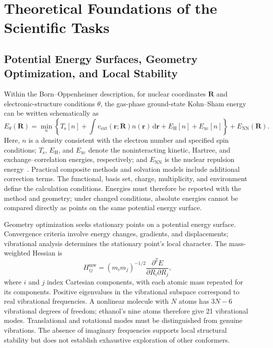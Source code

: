 \section{Theoretical Foundations of the Scientific Tasks}
\subsection{Potential Energy Surfaces, Geometry Optimization, and Local Stability}
Within the Born--Oppenheimer description, for nuclear coordinates $\mathbf R$ and electronic-structure conditions $\theta$, the gas-phase ground-state Kohn--Sham energy can be written schematically as
\begin{equation}
  E_{\theta}(\mathbf R)=\min_{n}\!\left\{T_{\mathrm s}[n]
  +\int v_{\mathrm{ext}}(\mathbf r;\mathbf R)n(\mathbf r)\,\mathrm d\mathbf r
  +E_{\mathrm H}[n]+E_{\mathrm{xc}}[n]\right\}
  +E_{\mathrm{NN}}(\mathbf R).
\end{equation}
Here, $n$ is a density consistent with the electron number and specified spin conditions; $T_{\mathrm s}$, $E_{\mathrm H}$, and $E_{\mathrm{xc}}$ denote the noninteracting kinetic, Hartree, and exchange--correlation energies, respectively; and $E_{\mathrm{NN}}$ is the nuclear repulsion energy~\cite{hk,ks}.
Practical composite methods and solvation models include additional correction terms.
The functional, basis set, charge, multiplicity, and environment define the calculation conditions.
Energies must therefore be reported with the method and geometry; under changed conditions, absolute energies cannot be compared directly as points on the same potential energy surface.

Geometry optimization seeks stationary points on a potential energy surface.
Convergence criteria involve energy changes, gradients, and displacements; vibrational analysis determines the stationary point's local character.
The mass-weighted Hessian is
\begin{equation}
  H^{\mathrm{mw}}_{ij}=(m_i m_j)^{-1/2}
  \frac{\partial^2 E}{\partial R_i\partial R_j},
\end{equation}
where $i$ and $j$ index Cartesian components, with each atomic mass repeated for its components.
Positive eigenvalues in the vibrational subspace correspond to real vibrational frequencies.
A nonlinear molecule with $N$ atoms has $3N-6$ vibrational degrees of freedom; ethanol's nine atoms therefore give 21 vibrational modes.
Translational and rotational modes must be distinguished from genuine vibrations.
The absence of imaginary frequencies supports local structural stability but does not establish exhaustive exploration of other conformers.

